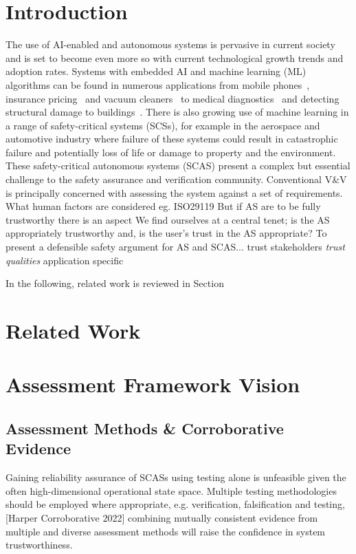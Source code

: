 \section{Introduction}
The use of AI-enabled and autonomous systems is pervasive in current society and is set to become even more so with current technological growth trends and adoption rates. Systems with embedded AI and machine learning (ML) algorithms can be found in numerous applications from mobile phones~\cite{medium_ai_phones}, insurance pricing~\cite{kuo2020towards} and vacuum cleaners~\cite{tf_vacuum} to medical diagnostics~\cite{kononenko2001machine} and detecting structural damage to buildings~\cite{avci2021review}. 
%
There is also growing use of machine learning in a range of safety-critical systems (SCSs), for example in the aerospace and automotive industry where failure of these systems could result in catastrophic failure and potentially loss of life or damage to property and the environment. These safety-critical autonomous systems (SCAS) present a complex but essential challenge to the safety assurance and verification community. 
%
Conventional V\&V is principally concerned with assessing the system against a set of requirements. 
What human factors are considered eg. ISO29119
But if AS are to be fully trustworthy there is an aspect
We find ourselves at a central tenet; is the AS appropriately trustworthy and, is the user's trust in the AS appropriate?
%
To present a defensible safety argument for AS and SCAS...
trust stakeholders
\emph{trust qualities}
application specific


In the following, related work is reviewed in Section

\section{Related Work}\label{Related_work}


\section{Assessment Framework Vision}\label{Assessment_Framework_Vision}


\subsection{Assessment Methods \& Corroborative Evidence}
Gaining reliability assurance of SCASs using testing alone is unfeasible given the often high-dimensional operational state space. Multiple testing methodologies should be employed where appropriate, e.g. verification, falsification and testing, [Harper Corroborative 2022] combining mutually consistent evidence from multiple and diverse assessment methods will raise the confidence in system trustworthiness.

